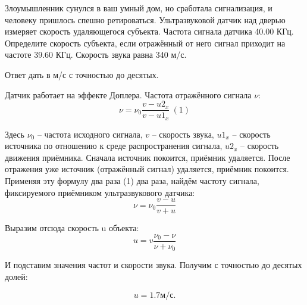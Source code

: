 
Злоумышленник сунулся в ваш умный дом, но сработала сигнализация, и человеку пришлось спешно ретироваться. Ультразвуковой датчик над дверью измеряет скорость удаляющегося субъекта. Частота сигнала датчика 40.00 КГц. Определите скорость субъекта, если отражённый от него сигнал приходит на частоте 39.60 КГц. Скорость звука равна 340 м/с.

Ответ дать в м/с с точностью до десятых.

\solutionSection

Датчик работает на эффекте Доплера. Частота отражённого 
сигнала $ν$:
$$ν=ν_0 \frac{v-u2_x}{v-u1_x}\: (1)$$

Здесь $ν_0$ – частота исходного сигнала, $v$ – скорость звука, 
$u1_x$ – скорость источника по отношению к среде 
распространения сигнала, $u2_x$ – скорость движения приёмника. Сначала источник покоится, 
приёмник удаляется. После отражения уже источник 
(отражённый сигнал) удаляется, приёмник покоится. 
Применяя эту формулу два раза (1) два раза, найдём частоту 
сигнала, фиксируемого приёмником ультразвукового датчика:
$$ν=ν_0 \frac{v-u}{v+u}$$

Выразим отсюда скорость u объекта:
$$u=v \frac{ν_0-ν}{ν+ν_0}$$

И подставим значения частот и скорости звука. Получим с 
точностью до десятых долей:

$$u=1.7 \text{м/с}.$$

